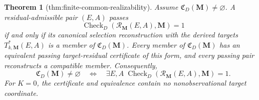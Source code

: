 \documentclass{article}
\newtheorem{theorem}{Theorem}
\begin{document}
\begin{theorem}[thm:finite-common-realizability]\label{thm:finite-common-realizability}
Assume \(\mathfrak C_D(\mathbf M)\ne\varnothing\).  A residual-admissible pair \((E,A)\) passes
\[
\operatorname{Check}_{D}(\mathcal R_{\mathbf M}(E,A),\mathbf M)=1
\]
if and only if its canonical selection reconstruction with the derived targets \(T^*_{k,\mathbf M}(E,A)\) is a member of \(\mathfrak C_D(\mathbf M)\).  Every member of \(\mathfrak C_D(\mathbf M)\) has an equivalent passing target-residual certificate of this form, and every passing pair reconstructs a compatible member.  Consequently,
\[
\mathfrak C_D(\mathbf M)\ne\varnothing
\quad\Longleftrightarrow\quad
\exists E,A\;
\operatorname{Check}_{D}\!\left(\mathcal R_{\mathbf M}(E,A),\mathbf M\right)=1.
\]
For \(K=0\), the certificate and equivalence contain no nonobservational target coordinate.
\end{theorem}
\end{document}
